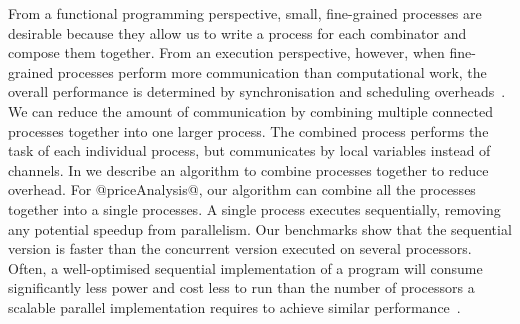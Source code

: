 
From a functional programming perspective, small, fine-grained processes are desirable because they allow us to write a process for each combinator and compose them together.
From an execution perspective, however, when fine-grained processes perform more communication than computational work, the overall performance is determined by synchronisation and scheduling overheads~\cite{chen1990impact}.
We can reduce the amount of communication by combining multiple connected processes together into one larger process.
The combined process performs the task of each individual process, but communicates by local variables instead of channels.
In  we describe an algorithm to combine processes together to reduce overhead.
For @priceAnalysis@, our algorithm can combine all the processes together into a single processes.
A single process executes sequentially, removing any potential speedup from parallelism.
Our benchmarks  show that the sequential version is faster than the concurrent version executed on several processors.
Often, a well-optimised sequential implementation of a program will consume significantly less power and cost less to run than the number of processors a scalable parallel implementation requires to achieve similar performance~\cite{mcsherry2015scalability}.


